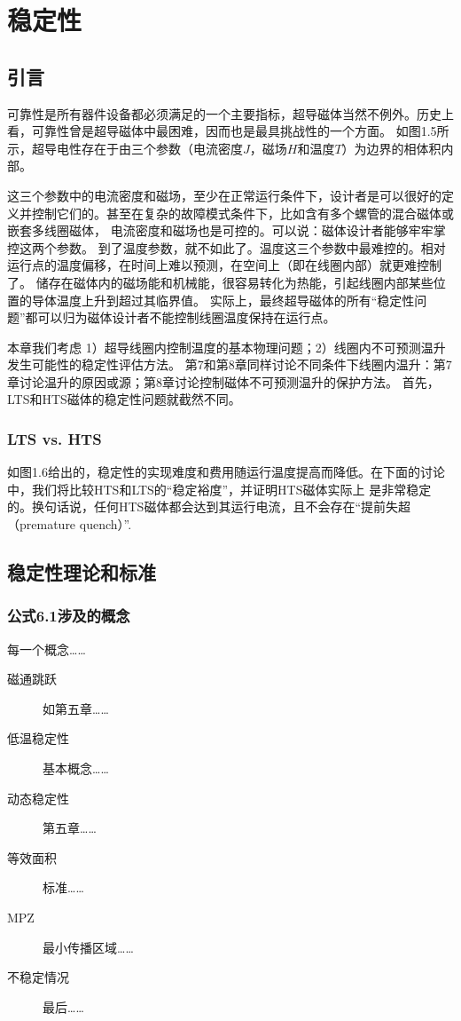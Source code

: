 \chapter{稳定性}
\section{引言}
可靠性是所有器件设备都必须满足的一个主要指标，超导磁体当然不例外。历史上看，可靠性曾是超导磁体中最困难，因而也是最具挑战性的一个方面。
如图1.5所示，超导电性存在于由三个参数（电流密度$J$，磁场$H$和温度$T$）为边界的相体积内部。

这三个参数中的电流密度和磁场，至少在正常运行条件下，设计者是可以很好的定义并控制它们的。甚至在复杂的故障模式条件下，比如含有多个螺管的混合磁体或嵌套多线圈磁体，
电流密度和磁场也是可控的。可以说：磁体设计者能够牢牢掌控这两个参数。
到了温度参数，就不如此了。温度这三个参数中最难控的。相对运行点的温度偏移，在时间上难以预测，在空间上（即在线圈内部）就更难控制了。
储存在磁体内的磁场能和机械能，很容易转化为热能，引起线圈内部某些位置的导体温度上升到超过其临界值。
实际上，最终超导磁体的所有“稳定性问题”都可以归为磁体设计者不能控制线圈温度保持在运行点。

本章我们考虑 1）超导线圈内控制温度的基本物理问题；2）线圈内不可预测温升发生可能性的稳定性评估方法。
第7和第8章同样讨论不同条件下线圈内温升：第7章讨论温升的原因或源；第8章讨论控制磁体不可预测温升的保护方法。
首先，LTS和HTS磁体的稳定性问题就截然不同。

\subsection*{LTS vs. HTS}
如图1.6给出的，稳定性的实现难度和费用随运行温度提高而降低。在下面的讨论中，我们将比较HTS和LTS的“稳定裕度”，并证明HTS磁体实际上
是非常稳定的。换句话说，任何HTS磁体都会达到其运行电流，且不会存在“提前失超（premature quench）”.

\section{稳定性理论和标准}

\subsection{公式6.1涉及的概念}
每一个概念……
\begin{description}
  \item[磁通跳跃] 如第五章……
  \item[低温稳定性] 基本概念……
  \item[动态稳定性] 第五章……
  \item[等效面积] 标准……
  \item[MPZ] 最小传播区域……
  \item[不稳定情况] 最后……
\end{description}



